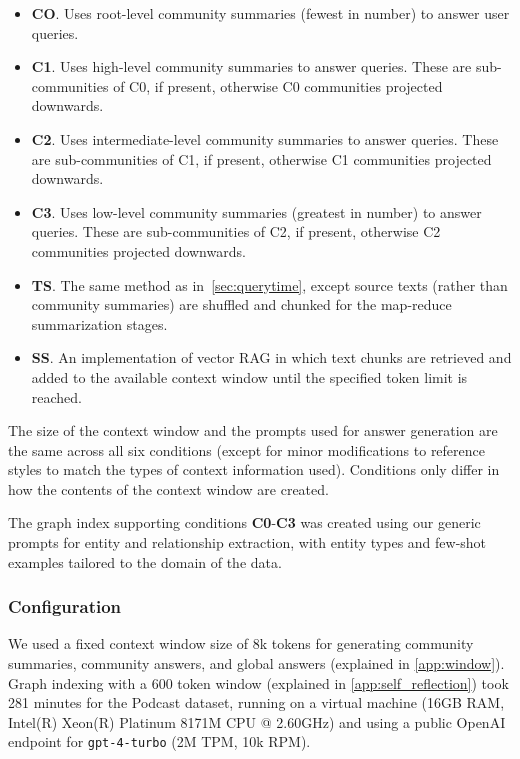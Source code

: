 \documentclass{article}
\begin{document}
\begin{itemize}
\item \textbf{CO}. Uses root-level community summaries (fewest in number) to answer user queries.
\item \textbf{C1}. Uses high-level community summaries to answer queries. These are sub-communities of C0, if present, otherwise C0 communities projected downwards.
\item \textbf{C2}. Uses intermediate-level community summaries to answer queries. These are sub-communities of C1, if present, otherwise C1 communities projected downwards.
\item \textbf{C3}. Uses low-level community summaries (greatest in number) to answer queries. These are sub-communities of C2, if present, otherwise C2 communities projected downwards.
\item \textbf{TS}. The same method as in~\autoref{sec:querytime}, except source texts (rather than community summaries) are shuffled and chunked for the map-reduce summarization stages.
\item \textbf{SS}. An implementation of vector RAG in which text chunks are retrieved and added to the available context window until the specified token limit is reached.
\end{itemize}

The size of the context window and the prompts used for answer generation are the same across all six conditions (except for minor modifications to reference styles to match the types of context information used).
Conditions only differ in how the contents of the context window are created.

The graph index supporting conditions \textbf{C0}-\textbf{C3} was created using our generic prompts for entity and relationship extraction, with entity types and few-shot examples tailored to the domain of the data. 

\subsubsection{Configuration}

We used a fixed context window size of 8k tokens for generating community summaries, community answers, and global answers (explained in \autoref{app:window}).
Graph indexing with a 600 token window (explained in \autoref{app:self_reflection}) took 281 minutes for the Podcast dataset, running on a virtual machine (16GB RAM, Intel(R) Xeon(R) Platinum 8171M CPU @ 2.60GHz) and using a public OpenAI endpoint for \texttt{gpt-4-turbo} (2M TPM, 10k RPM).
\end{document}
